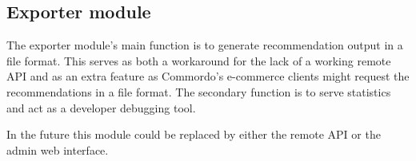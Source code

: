 
\subsection{Exporter module}

The exporter module's main function is to generate recommendation output in a file format. This serves as both a workaround for the lack of a working remote API and as an extra feature as Commordo's e-commerce clients might request the recommendations in a file format.  The secondary function is to serve statistics and act as a developer debugging tool.

In the future this module could be replaced by either the remote API or the admin web interface.

